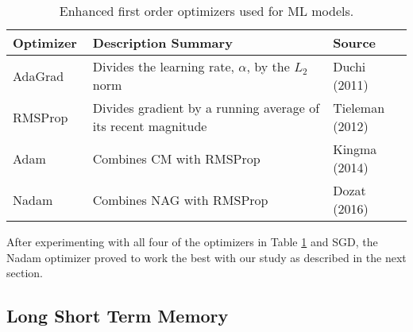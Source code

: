 %
\begin{table}[H]
\centering
\caption{Enhanced first order optimizers used for ML models.}
\label{tb-optimizers}
\begin{tabular}{@{}p{0.2\linewidth}p{0.6\linewidth}p{0.2\linewidth}@{}}
\toprule
\textbf{Optimizer} & \textbf{Description Summary} & \textbf{Source} \\ \midrule
AdaGrad & Divides the learning rate, $\alpha$, by the $L_{2}$ norm & Duchi (2011) \\
RMSProp & Divides gradient by a running average of its recent magnitude & Tieleman (2012) \\
Adam & Combines CM with RMSProp & Kingma (2014) \\
Nadam & Combines NAG with RMSProp & Dozat (2016) \\ \bottomrule
\end{tabular}
\end{table}    

%
After experimenting with all four of the optimizers in Table \ref{tb-optimizers} and SGD, the Nadam optimizer proved to work the best with our study as described in the next section.

\subsection{Long Short Term Memory}

